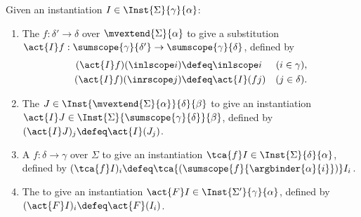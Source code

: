 \begin{definition}
  \label{def:instantiation-actions}%
  Given an instantiation $I \in \Inst{\Sigma}{\gamma}{\alpha}$:
  \begin{enumerate}

  \item The  $f : \delta' \to \delta$ over $\mvextend{\Sigma}{\alpha}$ to give a substitution $\act{I} f : \sumscope{\gamma}{\delta'} \to \sumscope{\gamma}{\delta}$, defined by
    \begin{align*}
      (\act{I}f)(\inlscope i) & \defeq \inlscope i & (i \in \gamma), \\
      (\act{I}f)(\inrscope j) & \defeq \act{I}(f j) & (j \in \delta).
    \end{align*}

  \item The  $J \in \Inst{\mvextend{\Sigma}{\alpha}}{\delta}{\beta}$ to give an instantiation $\act{I}J \in \Inst{\Sigma}{\sumscope{\gamma}{\delta}}{\beta}$, defined by $(\act{I}J)_j \defeq \act{I}(J_j)$.  

  \item A  $f : \delta \to \gamma$ over $\Sigma$  to give an instantiation $\tca{f} I \in \Inst{\Sigma}{\delta}{\alpha}$, defined by $(\tca{f}I)_i \defeq \tca{(\sumscope{f}{\argbinder{\alpha}{i}})}I_i$.

  \item The  to give an instantiation $\act{F} I \in \Inst{\Sigma'}{\gamma}{\alpha}$, defined by $(\act{F}I)_i \defeq \act{F}(I_i)$.
  \end{enumerate}
\end{definition}

